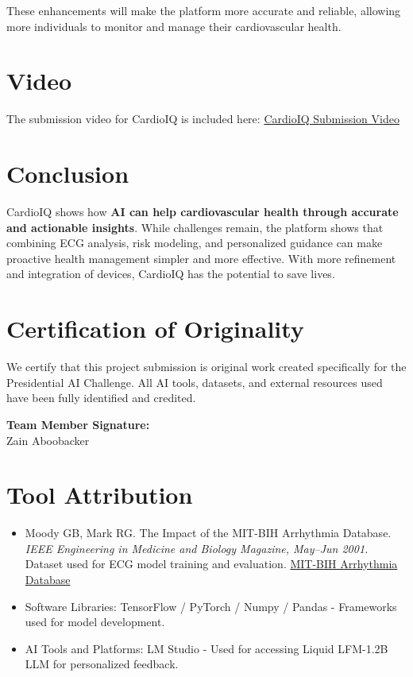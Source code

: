 \documentclass[12pt]{article}
\begin{document}
These enhancements will make the platform more accurate and reliable, allowing more individuals to monitor and manage their cardiovascular health.

\section*{Video}

The submission video for CardioIQ is included here:  \href{https://www.youtube.com/watch?v=BUGhDGgTrsQ}{CardioIQ Submission Video}

\section*{Conclusion}

CardioIQ shows how \textbf{AI can help cardiovascular health through accurate and actionable insights}. While challenges remain, the platform shows that combining ECG analysis, risk modeling, and personalized guidance can make proactive health management simpler and more effective. With more refinement and integration of devices, CardioIQ has the potential to save lives.

\section*{Certification of Originality}

We certify that this project submission is original work created specifically for the Presidential AI Challenge. All AI tools, datasets, and external resources used have been fully identified and credited.

\vspace{0.8cm}
\noindent\textbf{Team Member Signature:}\\
Zain Aboobacker

\section*{Tool Attribution}

\begin{itemize}[leftmargin=1.5em]
    \item Moody GB, Mark RG. The Impact of the MIT-BIH Arrhythmia Database. \textit{IEEE Engineering in Medicine and Biology Magazine, May–Jun 2001.} Dataset used for ECG model training and evaluation. \href{https://www.physionet.org/content/mitdb/1.0.0/}{MIT-BIH Arrhythmia Database}
    \item Software Libraries: TensorFlow / PyTorch / Numpy / Pandas - Frameworks used for model development.
    \item AI Tools and Platforms: LM Studio - Used for accessing Liquid LFM-1.2B LLM for personalized feedback.
\end{itemize}
\end{document}
